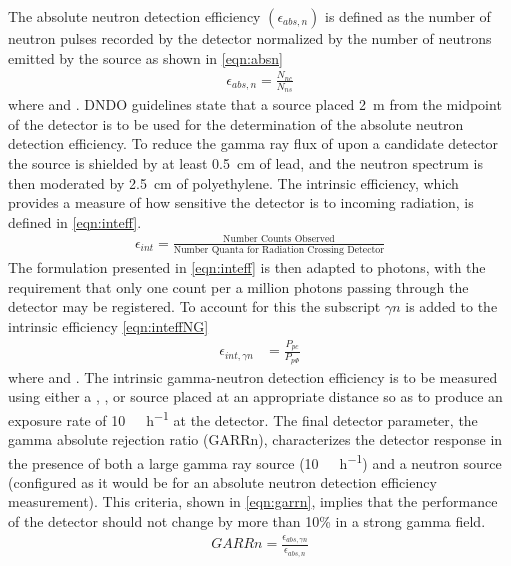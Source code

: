 The absolute neutron detection efficiency $\left (\epsilon_{abs,n} \right )$ is defined as the number of neutron pulses recorded by the detector normalized by the number of neutrons emitted by the source as shown in \autoref{eqn:absn}
\begin{align}
	\label{eqn:absn}
  \epsilon_{abs,n} = \frac{N_{nc}}{N_{ns}}
\end{align}
where  and .
DNDO guidelines state that a  source placed \SI{2}{\meter} from the midpoint of the detector is to be used for the determination of the absolute neutron detection efficiency\cite{pnnl_18471}.
To reduce the gamma ray flux of  upon a candidate detector the source is shielded by at least \SI{0.5}{\cm} of lead, and the neutron spectrum is then moderated by \SI{2.5}{\cm} of polyethylene\cite{pnnl_18471}.
The intrinsic efficiency, which provides a measure of how sensitive the detector is to incoming radiation, is defined in \eqref{eqn:inteff}.
\begin{align}
  \label{eqn:inteff}
  \epsilon_{int} = \frac{\text{Number Counts Observed}}{\text{Number Quanta for Radiation Crossing Detector}}
\end{align}
The formulation presented in \eqref{eqn:inteff} is then adapted to photons, with the requirement that only one count per a million photons passing through the detector may be registered.
To account for this the subscript $\gamma n$ is added to the intrinsic efficiency \eqref{eqn:inteffNG}
\begin{align}
  \label{eqn:inteffNG}
  \epsilon_{int,\gamma n} &= \frac{P_{pc}}{P_{p\Phi}}
\end{align}
where  and .
The intrinsic gamma-neutron detection efficiency is to be measured using either a , , or  source placed at an appropriate distance so as to produce an exposure rate of \SI{10}{\milli\roetgen\per\hour} at the detector\cite{kouzes_neutron_1999}.
The final detector parameter, the gamma absolute rejection ratio (GARRn), characterizes the detector response in the presence of both a large gamma ray source (\SI{10}{\milli\roetgen\per\hour}) and a  neutron source (configured as it would be for an absolute neutron detection efficiency measurement).
This criteria, shown in \eqref{eqn:garrn}, implies that the performance of the detector should not change by more than 10\% in a strong gamma field\cite{kouzes_neutron_1999}.
\begin{align}
  \label{eqn:garrn}
  GARRn = \frac{ \epsilon_{abs,\gamma n}}{\epsilon_{abs,n}}
\end{align}

